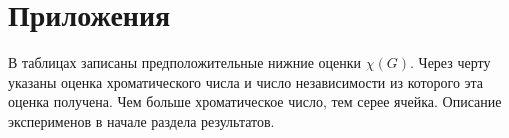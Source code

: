 \section{Приложения}
В таблицах записаны предположительные нижние оценки $\chi(G)$.
Через черту указаны оценка хроматического числа и число независимости
из которого эта оценка получена. Чем больше хроматическое число, тем серее
ячейка.  Описание эксперименов в начале раздела результатов.

















































